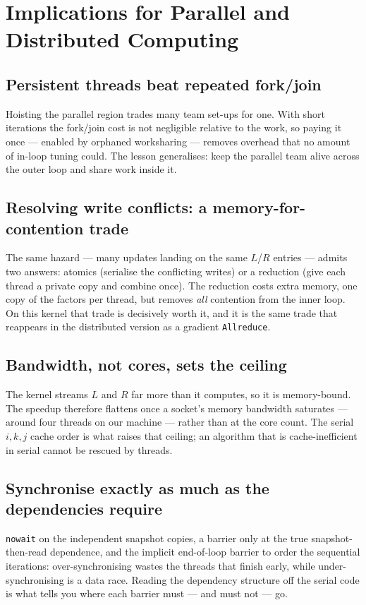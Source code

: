 \documentclass[twocolumn]{article}
\begin{document}
    \section{Implications for Parallel and Distributed Computing}\label{sec:pdc}

    \subsection{Persistent threads beat repeated fork/join}\label{subsec:fork}
    Hoisting the parallel region trades many team set-ups for one. With short iterations
    the fork/join cost is not negligible relative to the work, so paying it once ---
    enabled by orphaned worksharing --- removes overhead that no amount of in-loop tuning
    could. The lesson generalises: keep the parallel team alive across the outer loop and
    share work inside it.

    \subsection{Resolving write conflicts: a memory-for-contention trade}\label{subsec:trade}
    The same hazard --- many updates landing on the same $L$/$R$ entries --- admits two
    answers: atomics (serialise the conflicting writes) or a reduction (give each thread a
    private copy and combine once). The reduction costs extra memory, one copy of the
    factors per thread, but removes \emph{all} contention from the inner loop. On this
    kernel that trade is decisively worth it, and it is the same trade that reappears in
    the distributed version as a gradient \texttt{Allreduce}.

    \subsection{Bandwidth, not cores, sets the ceiling}\label{subsec:bandwidth}
    The kernel streams $L$ and $R$ far more than it computes, so it is memory-bound. The
    speedup therefore flattens once a socket's memory bandwidth saturates --- around four
    threads on our machine --- rather than at the core count. The serial $i,k,j$ cache
    order is what raises that ceiling; an algorithm that is cache-inefficient in serial
    cannot be rescued by threads.

    \subsection{Synchronise exactly as much as the dependencies require}\label{subsec:sync}
    \texttt{nowait} on the independent snapshot copies, a barrier only at the true
    snapshot-then-read dependence, and the implicit end-of-loop barrier to order the
    sequential iterations: over-synchronising wastes the threads that finish early, while
    under-synchronising is a data race. Reading the dependency structure off the serial
    code is what tells you where each barrier must --- and must not --- go.
\end{document}
